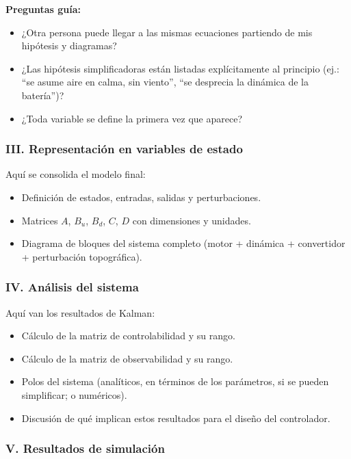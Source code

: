\documentclass[11pt,a4paper]{article}
\begin{document}
\begin{guia}
\textbf{Preguntas guía:}
\begin{itemize}
    \item ¿Otra persona puede llegar a las mismas ecuaciones partiendo de mis hipótesis y diagramas?
    \item ¿Las hipótesis simplificadoras están listadas explícitamente al principio (ej.: ``se asume aire en calma, sin viento'', ``se desprecia la dinámica de la batería'')?
    \item ¿Toda variable se define la primera vez que aparece?
\end{itemize}
\end{guia}

\subsubsection{III. Representación en variables de estado}

Aquí se consolida el modelo final:

\begin{itemize}
    \item Definición de estados, entradas, salidas y perturbaciones.
    \item Matrices $A$, $B_u$, $B_d$, $C$, $D$ con dimensiones y unidades.
    \item Diagrama de bloques del sistema completo (motor + dinámica + convertidor + perturbación topográfica).
\end{itemize}

\subsubsection{IV. Análisis del sistema}

Aquí van los resultados de Kalman:

\begin{itemize}
    \item Cálculo de la matriz de controlabilidad y su rango.
    \item Cálculo de la matriz de observabilidad y su rango.
    \item Polos del sistema (analíticos, en términos de los parámetros, si se pueden simplificar; o numéricos).
    \item Discusión de qué implican estos resultados para el diseño del controlador.
\end{itemize}

\subsubsection{V. Resultados de simulación}
\end{document}
